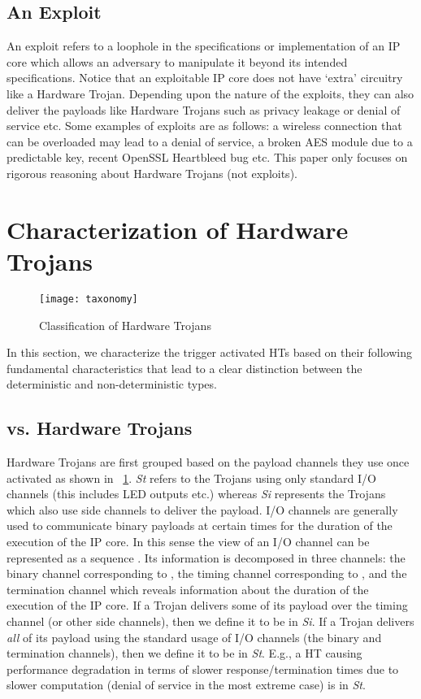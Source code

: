 \documentclass[10pt,journal,compsoc]{IEEEtran}
\begin{document}
\subsection{An Exploit}
An exploit refers to a loophole in the specifications or implementation of an IP core which allows an adversary to manipulate it beyond its intended specifications.
Notice that an exploitable IP core does not have `extra' circuitry like a Hardware Trojan.
Depending upon the nature of the exploits, they can also deliver the payloads like Hardware Trojans such as privacy leakage or denial of service etc.
Some examples of exploits are as follows: a wireless connection that can be overloaded may lead to a denial of service, a broken AES module due to a predictable key, recent OpenSSL Heartbleed bug etc. 
This paper only focuses on rigorous reasoning about Hardware Trojans (not exploits).







 \section{Characterization of Hardware Trojans}\label{sec:classification}

\begin{figure}[!t]
\centering
\texttt{[image: taxonomy]} 
\caption{Classification of Hardware Trojans}
\label{fig:taxonomy}
\end{figure}

In this section, we characterize the trigger activated HTs based on their following fundamental characteristics that lead to a clear distinction between the deterministic  and non-deterministic  types.


\subsection{ vs.  Hardware Trojans} 
Hardware Trojans are first grouped based on the payload channels they use once activated as shown in  \figurename~\ref{fig:taxonomy}.
\textit{St} refers to the Trojans using only standard I/O channels (this includes LED outputs etc.) whereas \textit{Si} represents the Trojans which also use side channels to deliver the payload.
I/O channels are generally used to communicate binary payloads  at certain times  for the duration of the execution of the IP core. 
In this sense the view of an I/O channel can be represented as a sequence . 
Its information is decomposed in three channels: the binary channel corresponding to , the timing channel corresponding to , and the termination channel  which reveals information about the duration of the execution of the IP core. 
If a Trojan delivers some of its payload over the timing channel (or other side channels), then we define it to be in \textit{Si}. 
If a Trojan delivers {\em all} of its payload using the standard usage of  I/O channels (the binary and termination channels), then we define it to be in \textit{St}.  
E.g., a HT causing performance degradation in terms of slower response/termination times due to slower computation (denial of service in the most extreme case) is in \textit{St}.
\end{document}
